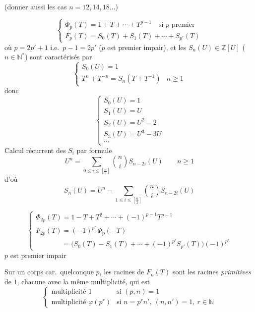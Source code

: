\documentclass[11pt,a4paper]{article}
\begin{document}
(donner aussi les cas $n=12,14,18\ldots$)

\[
\begin{cases}
\Phi_p(T) = 1+T+\cdots+T^{p-1} \quad \text{si } p \text{ premier}\\
F_p(T) = S_0(T)+S_1(T)+\cdots+S_{p'}(T)
\end{cases}
\]
où $p=2p'+1$ i.e.\ $p-1=2p'$ ($p$ est premier impair), et les $S_n(U)\in\mathbb{Z}[U]$ ($n\in\mathbb{N}^*$) sont caractérisés par
\[
\begin{cases} S_0(U) = 1\\ T^n+T^{-n} = S_n(T+T^{-1}) & n\geqslant 1\end{cases}
\]
donc
\[
\begin{cases} S_0(U)=1\\ S_1(U) = U\\ S_2(U) = U^2-2\\ S_3(U) = U^3-3U\\ \cdots\end{cases}
\]
Calcul récurrent des $S_i$ par formule 
\[
U^n = \sum_{0\leqslant i\leqslant[\frac n2]} \binom{n}{i} S_{n-2i}(U) \qquad n\geqslant 1
\]
d'où
\[
S_n(U) = U^n - \sum_{1\leqslant i\leqslant[\frac n2]}\binom{n}{i} S_{n-2i}(U)
\]

\[
\begin{cases}
\Phi_{2p}(T) = 1-T+T^2+\cdots+(-1)^{p-1}T^{p-1}\\
F_{2p}(T) = (-1)^{p'}\,\Phi_p(-T)\\
\phantom{F_{2p}(T)} = \bigl(S_0(T)-S_1(T)+\cdots+(-1)^{p'}S_{p'}(T)\bigr)(-1)^{p'}
\end{cases}
\]
$p$ est premier impair

Sur un corps  car.\ quelconque $p$, les racines de $F_n(T)$ sont les racines \emph{primitives}   de $1$, chacune avec la même multiplicité, qui est
\[
\begin{cases}
\text{multiplicité } 1 & \text{si } (p,n)=1\\
\text{multiplicité } \varphi(p^r) & \text{si } n=p^r n',\ (n,n')=1,\ r\in\mathbb{N}
\end{cases}
\]
\end{document}
